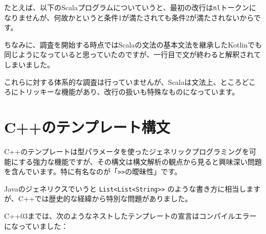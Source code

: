 たとえば、以下のScalaプログラムについていうと、最初の改行は\texttt{nl}トークンになりませんが、何故かというと条件1が満たされても条件2が満たされないからです。

\begin{Shaded}
\begin{Highlighting}[]
\NormalTok{      + }
\end{Highlighting}
\end{Shaded}

ちなみに、調査を開始する時点ではScalaの文法の基本文法を継承したKotlinでも同じようになっていると思っていたのですが、一行目で文が終わると解釈されてしまいました。

\begin{Shaded}
\begin{Highlighting}[]
 \NormalTok{ = }
\NormalTok{      + } 
\end{Highlighting}
\end{Shaded}

これらに対する体系的な調査は行っていませんが、Scalaは文法上、ところどころにトリッキーな機能があり、改行の扱いも特殊なものになっています。

\hypertarget{chapter7-cux306eux30c6ux30f3ux30d7ux30ecux30fcux30c8ux69cbux6587}{%
\section{C++のテンプレート構文}\label{chapter7-cux306eux30c6ux30f3ux30d7ux30ecux30fcux30c8ux69cbux6587}}

C++のテンプレートは型パラメータを使ったジェネリックプログラミングを可能にする強力な機能ですが、その構文は構文解析の観点から見ると興味深い問題を含んでいます。特に有名なのが「\texttt{\textgreater{}\textgreater{}}の曖昧性」です。

Javaのジェネリクスでいうと
\texttt{List\textless{}List\textless{}String\textgreater{}\textgreater{}}
のような書き方に相当しますが、C++では歴史的な経緯から特別な問題がありました。

C++03までは、次のようなネストしたテンプレートの宣言はコンパイルエラーになっていました：

\begin{Shaded}
\begin{Highlighting}[]
\end{Highlighting}
\end{Shaded}

